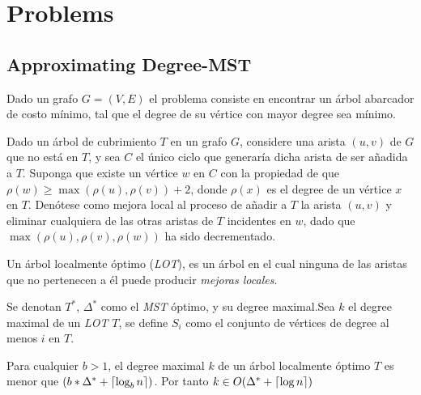 \documentclass[../np-approximations.tex]{subfiles}
\begin{document}
\section{Problems}

\subsection{Approximating Degree-MST}

\begin{statement}
	Dado un grafo $G=(V,E)$ el problema consiste en encontrar un árbol abarcador de costo mínimo, tal que el degree de su vértice con mayor degree sea mínimo.
\end{statement}

\begin{definition}
	Dado un árbol de cubrimiento $T$ en un grafo $G$, considere una 
	arista $(u,v)$ de $G$ que no está en $T$, y sea $C$ el único 
	ciclo que generaría dicha arista de ser añadida a $T$. Suponga 
	que existe un vértice $w$ en $C$ con la propiedad de que
	$\rho(w) \ge \max(\rho(u),\rho(v))+2$, donde $\rho(x)$ es el 
	degree de un vértice $x$ en $T$. Denótese como mejora local al 
	proceso de añadir a $T$ la arista $(u,v)$ y eliminar cualquiera 
	de las otras aristas de $T$ incidentes en $w$, dado que
	$\max(\rho(u),\rho(v),\rho(w))$ ha sido decrementado.
\end{definition}

\begin{definition}[LOT]
	Un árbol localmente óptimo (\emph{LOT}), es un árbol en el cual 
	ninguna de las aristas que no pertenecen a él puede producir 
	\emph{mejoras locales}.
\end{definition}

Se denotan $T^*$, $\Delta^*$ como el \emph{MST} óptimo, y su degree 
maximal.Sea $k$ el degree maximal de un \emph{LOT} $T$, se define 
$S_i$ como el conjunto de vértices de degree al menos $i$ en $T$.

\begin{theorem}
	Para cualquier $b>1$, el degree maximal $k$ de un árbol 
	localmente óptimo $T$ es menor que
	$(b*\Delta^* + \left \lceil \log_b n \right \rceil )$. Por tanto
	$k \in O(\Delta^* + \left \lceil \log n \right \rceil )$
\end{theorem}
\end{document}
